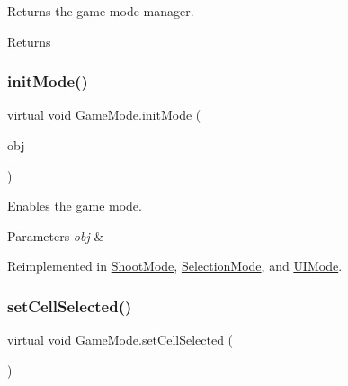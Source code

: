 Returns the game mode manager. 

\begin{DoxyReturn}{Returns}

\end{DoxyReturn}
\mbox{\label{class_game_mode_ac6701d024e8ab5bf8a8876618a6fd01f}} 
\subsubsection{\texorpdfstring{init\+Mode()}{initMode()}}
{\footnotesize\ttfamily virtual void Game\+Mode.\+init\+Mode (\begin{DoxyParamCaption}\item[{\mbox{\hyperlink{class_selectable_object}{Selectable\+Object}}}]{obj }\end{DoxyParamCaption})\hspace{0.3cm}{\ttfamily [virtual]}}



Enables the game mode. 


\begin{DoxyParams}{Parameters}
{\em obj} & \\
\hline
\end{DoxyParams}


Reimplemented in \mbox{\hyperlink{class_shoot_mode_ac89bf282dbd0cb303ca249b6e45b3507}{Shoot\+Mode}}, \mbox{\hyperlink{class_selection_mode_a6a73f2cb41889a41fcffaa417119d921}{Selection\+Mode}}, and \mbox{\hyperlink{class_u_i_mode_a97dcd9e20017c87075bcc9c1a560d8a8}{U\+I\+Mode}}.

\mbox{\label{class_game_mode_af0110e3ce61ccc4d2f77d64ffb9eeecf}} 
\subsubsection{\texorpdfstring{set\+Cell\+Selected()}{setCellSelected()}}
{\footnotesize\ttfamily virtual void Game\+Mode.\+set\+Cell\+Selected (\begin{DoxyParamCaption}{ }\end{DoxyParamCaption})\hspace{0.3cm}{\ttfamily [virtual]}}



